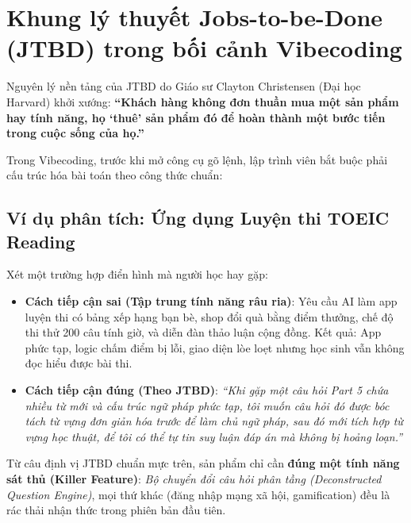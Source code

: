 \documentclass[a4paper,11pt]{article}
\begin{document}
\section{Khung lý thuyết Jobs-to-be-Done (JTBD) trong bối cảnh Vibecoding}

Nguyên lý nền tảng của JTBD do Giáo sư Clayton Christensen (Đại học Harvard) khởi xướng: \textbf{``Khách hàng không đơn thuần mua một sản phẩm hay tính năng, họ `thuê' sản phẩm đó để hoàn thành một bước tiến trong cuộc sống của họ.''}

Trong Vibecoding, trước khi mở công cụ gõ lệnh, lập trình viên bắt buộc phải cấu trúc hóa bài toán theo công thức chuẩn:

\begin{center}
\end{center}

\subsection{Ví dụ phân tích: Ứng dụng Luyện thi TOEIC Reading}
Xét một trường hợp điển hình mà người học hay gặp:
\begin{itemize}[leftmargin=1.5em]
    \item \textbf{Cách tiếp cận sai (Tập trung tính năng râu ria)}: Yêu cầu AI làm app luyện thi có bảng xếp hạng bạn bè, shop đổi quà bằng điểm thưởng, chế độ thi thử 200 câu tính giờ, và diễn đàn thảo luận cộng đồng. Kết quả: App phức tạp, logic chấm điểm bị lỗi, giao diện lòe loẹt nhưng học sinh vẫn không đọc hiểu được bài thi.
    \item \textbf{Cách tiếp cận đúng (Theo JTBD)}: \textit{``Khi gặp một câu hỏi Part 5 chứa nhiều từ mới và cấu trúc ngữ pháp phức tạp, tôi muốn câu hỏi đó được bóc tách từ vựng đơn giản hóa trước để làm chủ ngữ pháp, sau đó mới tích hợp từ vựng học thuật, để tôi có thể tự tin suy luận đáp án mà không bị hoảng loạn.''}
\end{itemize}

Từ câu định vị JTBD chuẩn mực trên, sản phẩm chỉ cần \textbf{đúng một tính năng sát thủ (Killer Feature)}: \textit{Bộ chuyển đổi câu hỏi phân tầng (Deconstructed Question Engine)}, mọi thứ khác (đăng nhập mạng xã hội, gamification) đều là rác thải nhận thức trong phiên bản đầu tiên.
\end{document}
